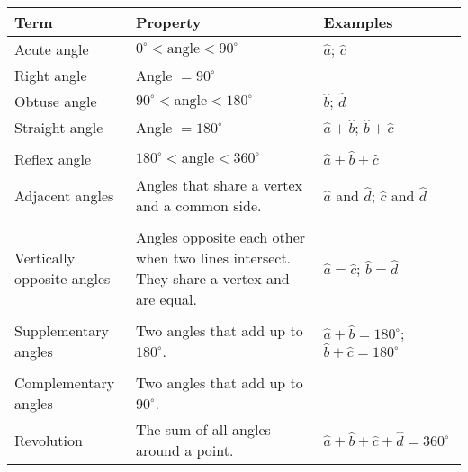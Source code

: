 \begin{table}[H]
\begin{center}
\begin{tabular}{|p{3.5cm}|p{4cm}|p{4cm}|} \hline
\textbf{Term} & \textbf{Property} & \textbf{Examples}\\ \hline
Acute angle & $0^{\circ} < \mbox{angle} < 90^{\circ}$ & $\hat{a}$; $\hat{c}$ \\ \hline
Right angle & Angle $= 90^{\circ}$ &  \\ \hline
Obtuse angle & $90^{\circ} < \mbox{angle} < 180^{\circ}$ & $\hat{b}$; $\hat{d}$ \\ \hline
Straight angle & Angle $= 180^{\circ}$ & $\hat{a} + \hat{b}$;  $\hat{b} + \hat{c}$  \\
& &  \\ \hline
Reflex angle & $180^{\circ} < \mbox{angle} < 360^{\circ}$ & $\hat{a} + \hat{b} + \hat{c}$ \\ \hline
Adjacent angles & Angles that share a vertex and a common side. & $\hat{a}$ and $\hat{d}$;  $\hat{c}$ and $\hat{d}$ \\ 
& &  \\ \hline
Vertically opposite angles & Angles opposite each other when two lines intersect. They share a vertex and are equal. & $\hat{a}=\hat{c}$;  $\hat{b}=\hat{d}$\\
 &  & \\ \hline
Supplementary angles & Two angles that add up to $180^{\circ}$. & $\hat{a}+\hat{b}=180^{\circ}$; $\hat{b}+\hat{c}=180^{\circ}$ \\ 
& &  \\ \hline
Complementary angles & Two angles that add up to $90^{\circ}$. & \\ \hline
Revolution & The sum of all angles around a point. &  $\hat{a}+\hat{b}+\hat{c}+\hat{d}=360^{\circ}$ \\ \hline

\end{tabular}
\end{center}
\end{table}
\par


